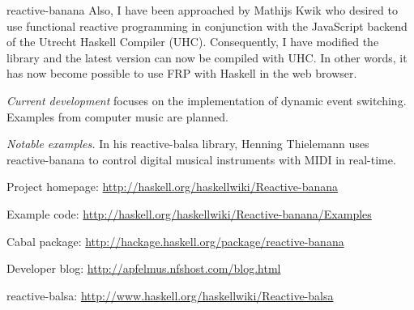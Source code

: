\begin{hcarentry}[updated]{reactive-banana}
Also, I have been approached by Mathijs Kwik who desired to use functional reactive programming in conjunction with the JavaScript backend of the Utrecht Haskell Compiler (UHC). Consequently, I have modified the library and the latest version can now be compiled with UHC. In other words, it has now become possible to use FRP with Haskell in the web browser.

\emph{Current development} focuses on the implementation of dynamic event switching. Examples from computer music are planned.

\emph{Notable examples.} In his reactive-balsa library, Henning Thielemann uses reactive-banana to control digital musical instruments with MIDI in real-time.

\FurtherReading
\begin{compactitem}
\item Project homepage: \url{http://haskell.org/haskellwiki/Reactive-banana}
\item Example code: \url{http://haskell.org/haskellwiki/Reactive-banana/Examples}
\item Cabal package: \url{http://hackage.haskell.org/package/reactive-banana}
\item Developer blog:  \url{http://apfelmus.nfshost.com/blog.html}
\item reactive-balsa: \url{http://www.haskell.org/haskellwiki/Reactive-balsa}
\end{compactitem}
\end{hcarentry}
